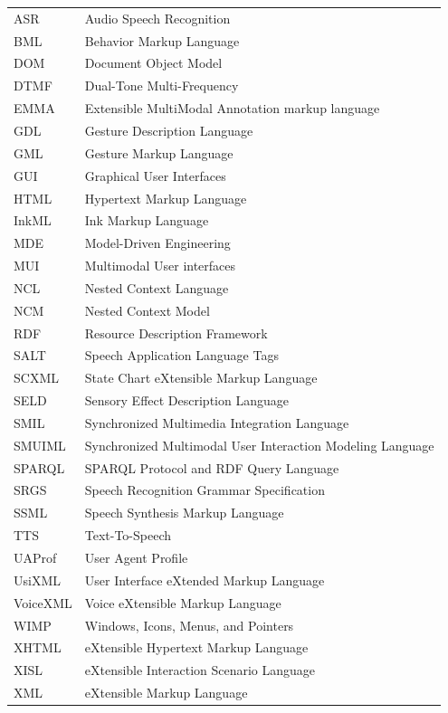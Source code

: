 \documentclass[
  doutorado,
  american
]{ThesisPUC}
\begin{document}
\begin{thenotations}
\begin{tabular}{ll}
	ASR & Audio Speech Recognition\\ 
	BML & Behavior Markup Language\\ 
	DOM & Document Object Model\\ 
	DTMF & Dual-Tone Multi-Frequency\\ 
	EMMA & Extensible MultiModal Annotation markup language \\ 
	GDL & Gesture Description Language \\ 
	GML & Gesture Markup Language \\ 
	GUI & Graphical User Interfaces \\ 
	HTML & Hypertext Markup Language \\ 
	InkML & Ink Markup Language \\ 
	MDE & Model-Driven Engineering \\   
	MUI & Multimodal User interfaces \\   
	NCL & Nested Context Language \\   
	NCM & Nested Context Model \\   
	RDF & Resource Description Framework \\   
	SALT & Speech Application Language Tags \\   
	SCXML & State Chart eXtensible Markup Language \\   
	SELD & Sensory Effect Description Language \\   
	SMIL & Synchronized Multimedia Integration Language \\   
	SMUIML & Synchronized Multimodal User Interaction Modeling
	Language \\   
	SPARQL & SPARQL Protocol and RDF Query Language \\   
	SRGS & Speech Recognition Grammar Specification \\   
	SSML & Speech Synthesis Markup Language \\   
	TTS & Text-To-Speech \\   
	UAProf & User Agent Profile \\   
	UsiXML & User Interface eXtended Markup Language \\   
	VoiceXML & Voice eXtensible Markup Language \\   
	WIMP & Windows, Icons, Menus, and Pointers \\  
	XHTML & eXtensible Hypertext Markup Language \\  
	XISL & eXtensible Interaction Scenario Language \\  
	XML & eXtensible Markup Language \\
\end{tabular}
\end{thenotations}
\end{document}
